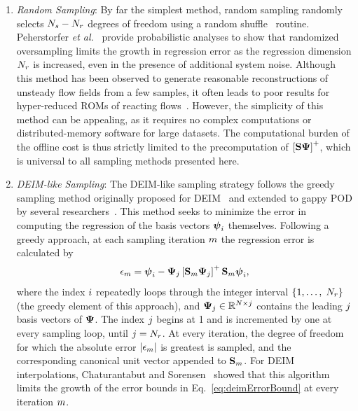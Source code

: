 \begin{enumerate}
	\item \textit{Random Sampling}: By far the simplest method, random sampling randomly selects $N_s - N_r$ degrees of freedom using a random shuffle \CC\ routine. Peherstorfer \textit{et al.}~\cite{Peherstorfer2020} provide probabilistic analyses to show that randomized oversampling limits the growth in regression error as the regression dimension $N_r$ is increased, even in the presence of additional system noise. Although this method has been observed to generate reasonable reconstructions of unsteady flow fields from a few samples, it often leads to poor results for hyper-reduced ROMs of reacting flows~\cite{Wentland2021}. However, the simplicity of this method can be appealing, as it requires no complex computations or distributed-memory software for large datasets. The computational burden of the offline cost is thus strictly limited to the precomputation of $\left[\sampMat \deimBasis\right]^+$, which is universal to all sampling methods presented here.

	\item \textit{DEIM-like Sampling}: The DEIM-like sampling strategy follows the greedy sampling method originally proposed for DEIM~\cite{Chaturantabut2010} and extended to gappy POD by several researchers~\cite{Zhou2012,Carlberg2013}. This method seeks to minimize the error in computing the regression of the basis vectors $\boldsymbol{\psi}_{i}$ themselves. Following a greedy approach, at each sampling iteration $m$ the regression error is calculated by
	\begin{equation}
		\errVec_{\greedyIdx} = \deimBasisVec_{\dummyIdx} - \deimBasis_{\dummyIdxTwo} \left[ \sampMat_{\greedyIdx} \deimBasis_{\dummyIdxTwo} \right]^+ \sampMat_{\greedyIdx}\deimBasisVec_{\dummyIdx},
	\end{equation}
	where the index $i$ repeatedly loops through the integer interval $\{1, \hdots, \; N_r\}$ (the greedy element of this approach), and $\deimBasis_{\dummyIdxTwo} \inRTwo{\numDOF}{\dummyIdxTwo}$ contains the leading $j$ basis vectors of $\deimBasis$. The index $j$ begins at 1 and is incremented by one at every sampling loop, until $j = N_r$. At every iteration, the degree of freedom for which the absolute error $|\epsilon_{m}|$ is greatest is sampled, and the corresponding canonical unit vector appended to $\mathbf{S}_{m}$. For DEIM interpolations, Chaturantabut and Sorensen~\cite{Chaturantabut2010} showed that this algorithm limits the growth of the error bounds in Eq.~\ref{eq:deimErrorBound} at every iteration $m$.


\end{enumerate}
